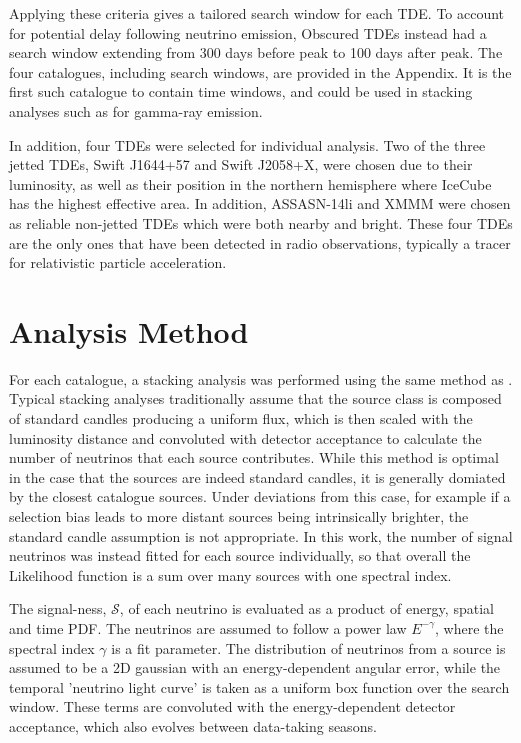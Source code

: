 \documentclass[twocolumn, tighten, linenumbers]{aastex62}
\begin{document}
Applying these criteria gives a tailored search window for each TDE. To account for potential delay following neutrino emission, Obscured TDEs instead had a search window extending from 300 days before peak to 100 days after peak. The four catalogues, including search windows, are provided in the Appendix. It is the first such catalogue to contain time windows, and could be used in stacking analyses such as for gamma-ray emission.

In addition, four TDEs were selected for individual analysis. Two of the three jetted TDEs, Swift J1644+57 and Swift J2058+X, were chosen due to their luminosity, as well as their position in the northern hemisphere where IceCube has the highest effective area. In addition, ASSASN-14li and XMMM were chosen as reliable non-jetted TDEs which were both nearby and bright. These four TDEs are the only ones that have been detected in radio observations, typically a tracer for relativistic particle acceleration.

% 
\section{Analysis Method}
\label{sec:AnalysisMethod}
For each catalogue, a stacking analysis was performed using the same method as \cite{stasik}. Typical stacking analyses traditionally assume that the source class is composed of standard candles producing a uniform flux, which is then scaled with the luminosity distance and convoluted with detector acceptance to calculate the number of neutrinos that each source contributes. While this method is optimal in the case that the sources are indeed standard candles, it is generally domiated by the closest catalogue sources. Under deviations from this case, for example if a selection bias leads to more distant sources being intrinsically brighter, the standard candle assumption is not appropriate. In this work, the number of signal neutrinos was instead fitted for each source individually, so that overall the Likelihood function is a sum over many sources with one spectral index.

The signal-ness, $\mathcal{S}$, of each neutrino is evaluated as a product of energy, spatial and time PDF. The neutrinos are assumed to follow a power law $E^{-\gamma}$, where the spectral index $\gamma$ is a fit parameter. The distribution of neutrinos from a source is assumed to be a 2D gaussian with an energy-dependent angular error, while the temporal 'neutrino light curve' is taken as a uniform box function over the search window. These terms are convoluted with the energy-dependent detector acceptance, which also evolves between data-taking seasons. 
\end{document}
